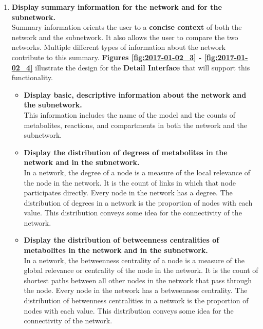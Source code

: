 \begin{enumerate}

\item \textbf{Display summary information for the network and for the subnetwork.}
\\ Summary information orients the user to a \textbf{concise context} of both the network and the subnetwork.
It also allows the user to compare the two networks.
Multiple different types of information about the network contribute to this summary.
\textbf{Figures \ref{fig:2017-01-02_3} - \ref{fig:2017-01-02_4}} illustrate the design for the \textbf{Detail Interface} that will support this functionality.

\begin{itemize}

\item \textbf{Display basic, descriptive information about the network and the subnetwork.}
\\ This information includes the name of the model and the counts of metabolites, reactions, and compartments in both the network and the subnetwork.

\item \textbf{Display the distribution of degrees of metabolites in the network and in the subnetwork.}
\\ In a network, the degree of a node is a measure of the local relevance of the node in the network.
It is the count of links in which that node participates directly.
Every node in the network has a degree.
The distribution of degrees in a network is the proportion of nodes with each value.
This distribution conveys some idea for the connectivity of the network.

\item \textbf{Display the distribution of betweenness centralities of metabolites in the network and in the subnetwork.}
\\ In a network, the betweenness centrality of a node is a measure of the global relevance or centrality of the node in the network.
It is the count of shortest paths between all other nodes in the network that pass through the node.
Every node in the network has a betweenness centrality.
The distribution of betwenness centralities in a network is the proportion of nodes with each value.
This distribution conveys some idea for the connectivity of the network.


\end{itemize}
\end{enumerate}

